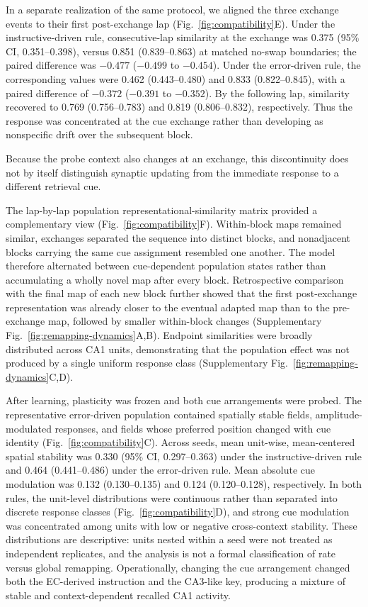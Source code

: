 In a separate realization of the same protocol, we aligned the three exchange events to their first post-exchange lap
(Fig.~\ref{fig:compatibility}E). Under the instructive-driven rule,
consecutive-lap similarity at the exchange was 0.375 (95\% CI,
0.351--0.398), versus 0.851 (0.839--0.863) at matched no-swap boundaries; the
paired difference was $-0.477$ ($-0.499$ to $-0.454$). Under the error-driven
rule, the corresponding values were 0.462 (0.443--0.480) and 0.833
(0.822--0.845), with a paired difference of $-0.372$ ($-0.391$ to $-0.352$).
By the following lap, similarity recovered to 0.769 (0.756--0.783) and 0.819
(0.806--0.832), respectively. Thus the response was concentrated at the cue
exchange rather than developing as nonspecific drift over the subsequent
block.

Because the probe context also changes at an exchange, this discontinuity
does not by itself distinguish synaptic updating from the immediate response
to a different retrieval cue.

The lap-by-lap population representational-similarity matrix provided a
complementary view (Fig.~\ref{fig:compatibility}F). Within-block maps remained
similar, exchanges separated the sequence into distinct blocks, and
nonadjacent blocks carrying the same cue assignment resembled one another.
The model therefore alternated between cue-dependent population states rather
than accumulating a wholly novel map after every block. Retrospective
comparison with the final map of each new block further showed that the first
post-exchange representation was already closer to the eventual adapted map
than to the pre-exchange map, followed by smaller within-block changes
(Supplementary Fig.~\ref{fig:remapping-dynamics}A,B). Endpoint similarities
were broadly distributed across CA1 units, demonstrating that the population
effect was not produced by a single uniform response class
(Supplementary Fig.~\ref{fig:remapping-dynamics}C,D).

After learning, plasticity was frozen and both cue arrangements were probed.
The representative error-driven population contained spatially stable fields,
amplitude-modulated responses, and fields whose preferred position changed
with cue identity (Fig.~\ref{fig:compatibility}C). Across seeds, mean
unit-wise, mean-centered spatial stability was 0.330 (95\% CI, 0.297--0.363)
under the instructive-driven rule and 0.464 (0.441--0.486) under the
error-driven rule. Mean absolute cue modulation
was 0.132 (0.130--0.135) and 0.124 (0.120--0.128), respectively. In both rules,
the unit-level distributions were continuous rather than separated into
discrete response classes (Fig.~\ref{fig:compatibility}D), and strong cue
modulation was concentrated among units with low or negative cross-context
stability. These distributions are descriptive: units nested within a seed
were not treated as independent replicates, and the analysis is not a formal
classification of rate versus global remapping. Operationally, changing the
cue arrangement changed both the EC-derived instruction and the CA3-like key,
producing a mixture of stable and context-dependent recalled CA1 activity.

